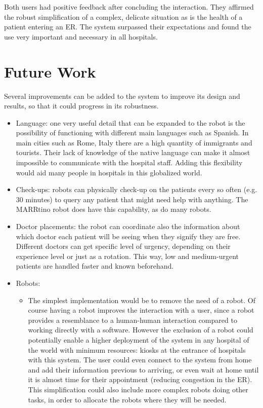 \documentclass[letterpaper]{article}
\begin{document}
Both users had positive feedback after concluding the interaction. They affirmed the robust simplification of a complex, delicate situation as is the health of a patient entering an ER. The system surpassed their expectations and found the use very important and necessary in all hospitals. 


\section{Future Work}
Several improvements can be added to the system to improve its design and results, so that it could progress in its robustness. 

\begin{itemize}
\item Language: one very useful detail that can be expanded to the robot is the possibility of functioning with different main languages such as Spanish. In main cities such as Rome, Italy there are a high quantity of immigrants and tourists. Their lack of knowledge of the native language can make it almost impossible to communicate with the hospital staff. Adding this flexibility would aid many people in hospitals in this globalized world.

\item Check-ups: robots can physically check-up on the patients every so often (e.g. 30 minutes) to query any patient that might need help with anything. The MARRtino robot does have this capability, as do many robots.

\item Doctor placements: the robot can coordinate also the information about which doctor each patient will be seeing when they signify they are free. Different doctors can get specific level of urgency, depending on their experience level or just as a rotation. This way, low and medium-urgent patients are handled faster and known beforehand.

\item Robots: 
    \begin{itemize}
    \item The simplest implementation would be to remove the need of a robot. Of course having a robot improves the interaction with a user, since a robot provides a resemblance to a human-human interaction compared to working directly with a software. However the exclusion of a robot could potentially enable a higher deployment of the system in any hospital of the world with minimum resources: kiosks at the entrance of hospitals with this system. The user could even connect to the system from home and add their information previous to arriving, or even wait at home until it is almost time for their appointment (reducing congestion in the ER). This simplification could also include more complex robots doing other tasks, in order to allocate the robots where they will be needed.
    

\end{itemize}
\end{itemize}
\end{document}
